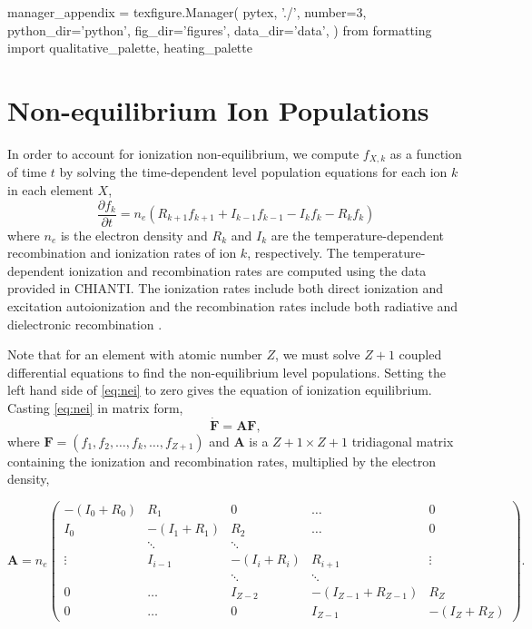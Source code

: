 \begin{pycode}
manager_appendix = texfigure.Manager(
    pytex, './',
    number=3,
    python_dir='python',
    fig_dir='figures',
    data_dir='data',
)
from formatting import qualitative_palette, heating_palette
\end{pycode}
\section{Non-equilibrium Ion Populations}\label{nei}

In order to account for ionization non-equilibrium, we compute $f_{X,k}$ as a function of time $t$ by solving the time-dependent level population equations for each ion $k$ in each element $X$,
\begin{equation}\label{eq:nei}
    \frac{\partial f_k}{\partial t} = n_e(R_{k+1}f_{k+1} + I_{k-1}f_{k-1} - I_kf_k - R_kf_k)
\end{equation}
where $n_e$ is the electron density and $R_k$ and $I_k$ are the temperature-dependent recombination and ionization rates of ion $k$, respectively. The temperature-dependent ionization and recombination rates are computed using the data provided in CHIANTI. The ionization rates include both direct ionization and excitation autoionization and the recombination rates include both radiative and dielectronic recombination \citep[see section 6 of][]{young_chianti_2016}.

Note that for an element with atomic number $Z$, we must solve $Z+1$ coupled differential equations to find the non-equilibrium level populations. Setting the left hand side of \autoref{eq:nei} to zero gives the equation of ionization equilibrium. Casting \autoref{eq:nei} in matrix form,
\begin{equation}\label{eq:nei_mat}
    \dot{\mathbf{F}} = \mathbf{A}\mathbf{F},
\end{equation}
where $\mathbf{F}=(f_1,f_2,\ldots,f_k,\ldots,f_{Z+1})$ and $\mathbf{A}$ is a ${Z+1\times Z+1}$ tridiagonal matrix containing the ionization and recombination rates, multiplied by the electron density,

\begin{equation*}
    \mathbf{A} = n_e
        \begin{pmatrix}
            -(I_0 + R_0) & R_1 & 0 & \dots & 0 \\
            I_0 & -(I_1 + R_1) & R_2 & \dots & 0 \\
             & \ddots & \ddots & &  \\
            \vdots & I_{i-1} & -(I_i + R_i) & R_{i+1} & \vdots \\
             & & \ddots & \ddots & \\
            0 & \dots & I_{Z-2} & -(I_{Z-1} + R_{Z-1}) & R_Z \\
            0 & \dots & 0 & I_{Z-1} & -(I_Z + R_Z) 
        \end{pmatrix}.
\end{equation*}

